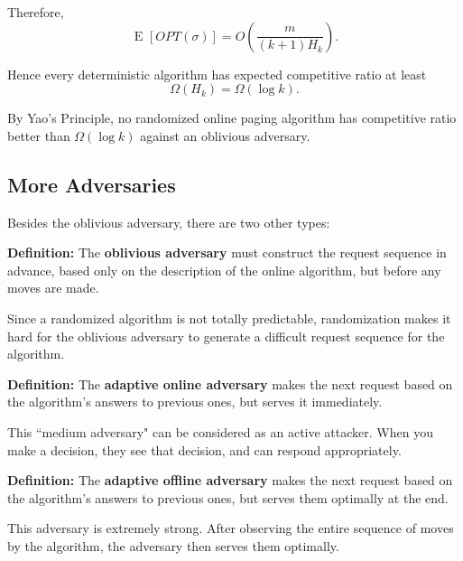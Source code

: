 \documentclass[14pt]{extreport}
\newcommand{\E}[2][]{\operatorname{E}_{#1}\left[#2\right]}
\begin{document}
    Therefore,
    $$\E{OPT(\sigma)}
    =
    O\left(\frac{m}{(k+1)H_k}\right).$$

    \vspace{2mm}
    Hence every deterministic algorithm has expected competitive ratio at least
    $$\Omega(H_k) = \Omega(\log k).$$

    \vspace{2mm}
    By Yao's Principle, no randomized online paging algorithm has competitive ratio better than $\Omega(\log k)$ against an oblivious adversary.

\subsection*{More Adversaries}
    Besides the oblivious adversary, there are two other types:
    
    \begin{tcolorbox}[colframe=gray!50, sharp corners]
        \textbf{Definition:} The \textbf{oblivious adversary} must construct the request sequence in advance, based only on the description of the online algorithm, but before any moves are made.
    \end{tcolorbox}

    Since a randomized algorithm is not totally predictable, randomization makes it hard for the oblivious adversary to generate a difficult request sequence for the algorithm. 
    
    \begin{tcolorbox}[colframe=gray!50, sharp corners]
        \textbf{Definition:} The \textbf{adaptive online adversary} makes the next request based on the algorithm's answers to previous ones, but serves it immediately.
    \end{tcolorbox}

    This ``medium adversary" can be considered as an active attacker. When you make a decision, they see that decision, and can respond appropriately.
    
    \begin{tcolorbox}[colframe=gray!50, sharp corners]
        \textbf{Definition:} The \textbf{adaptive offline adversary} makes the next request based on the algorithm's answers to previous ones, but serves them optimally at the end.
    \end{tcolorbox}

    This adversary is extremely strong. After observing the entire sequence of moves by the algorithm, the adversary then serves them optimally.
\end{document}
